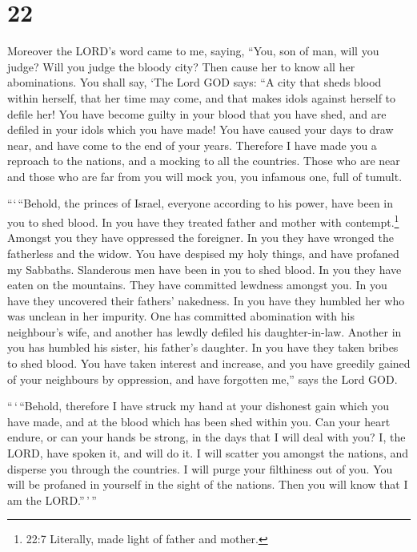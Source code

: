 \hypertarget{section-20}{%
\section{22}\label{section-20}}

 Moreover the LORD's word came to me, saying, 
``You, son of man, will you judge? Will you judge the bloody city? Then
cause her to know all her abominations.  You shall say, `The
Lord GOD says: ``A city that sheds blood within herself, that her time
may come, and that makes idols against herself to defile her!
 You have become guilty in your blood that you have shed,
and are defiled in your idols which you have made! You have caused your
days to draw near, and have come to the end of your years. Therefore I
have made you a reproach to the nations, and a mocking to all the
countries.  Those who are near and those who are far from
you will mock you, you infamous one, full of tumult.

 ```\,``Behold, the princes of Israel, everyone according to
his power, have been in you to shed blood.  In you have they
treated father and mother with contempt.\footnote{22:7 Literally, made
  light of father and mother.} Amongst you they have oppressed the
foreigner. In you they have wronged the fatherless and the widow.
 You have despised my holy things, and have profaned my
Sabbaths.  Slanderous men have been in you to shed blood. In
you they have eaten on the mountains. They have committed lewdness
amongst you.  In you have they uncovered their fathers'
nakedness. In you have they humbled her who was unclean in her impurity.
 One has committed abomination with his neighbour's wife,
and another has lewdly defiled his daughter-in-law. Another in you has
humbled his sister, his father's daughter.  In you have
they taken bribes to shed blood. You have taken interest and increase,
and you have greedily gained of your neighbours by oppression, and have
forgotten me,'' says the Lord GOD.

 ``\,`\,``Behold, therefore I have struck my hand at your
dishonest gain which you have made, and at the blood which has been shed
within you.  Can your heart endure, or can your hands be
strong, in the days that I will deal with you? I, the LORD, have spoken
it, and will do it.  I will scatter you amongst the
nations, and disperse you through the countries. I will purge your
filthiness out of you.  You will be profaned in yourself in
the sight of the nations. Then you will know that I am the
LORD.''\,'\,''

